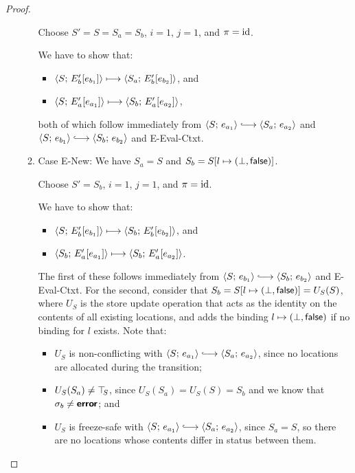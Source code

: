 \begin{proof}
\begin{enumerate}
\begin{enumerate}
      Choose $S' = S = S_a = S_b$, $i = 1$, $j = 1$, and $\pi = \mathrm{id}$.

      We have to show that:
      \begin{itemize}
      \item $\langle S;\, E'_b\hspace{-0.5mm}\left[e_{b_1}\right] \rangle \longmapsto
        \langle S_a;\, E'_b\hspace{-0.5mm}\left[e_{b_2}\right] \rangle$, and
      \item $\langle S;\, E'_a\hspace{-0.5mm}\left[e_{a_1}\right] \rangle \longmapsto
        \langle S_b;\, E'_a\hspace{-0.5mm}\left[e_{a_2}\right] \rangle$, 
      \end{itemize}

      both of which follow immediately from $\config{S}{e_{a_1}}
      \parstepsto \config{S_a}{e_{a_2}}$ and $\config{S}{e_{b_1}}
      \parstepsto \config{S_b}{e_{b_2}}$ and {\sc E-Eval-Ctxt}.

    \item \label{slqc-beta-new}Case {\sc E-New}: We have $S_a = S$ and
      $S_b = S[l \mapsto (\bot, \textsf{false})]$.

      Choose $S' = S_b$, $i = 1$, $j = 1$, and $\pi = \mathrm{id}$.

      We have to show that:
      \begin{itemize}
      \item $\langle S;\, E'_b\hspace{-0.5mm}\left[e_{b_1}\right] \rangle \longmapsto
        \langle S_b;\, E'_b\hspace{-0.5mm}\left[e_{b_2}\right] \rangle$, and
      \item $\langle S_b;\, E'_a\hspace{-0.5mm}\left[e_{a_1}\right] \rangle \longmapsto
        \langle S_b;\, E'_a\hspace{-0.5mm}\left[e_{a_2}\right] \rangle$.
      \end{itemize}

      The first of these follows immediately from $\config{S}{e_{b_1}}
      \parstepsto \config{S_b}{e_{b_2}}$ and {\sc E-Eval-Ctxt}.  For
      the second, consider that $S_b = S[l \mapsto (\bot, \textsf{false})]
      = U_S(S)$, where $U_S$ is the store update operation that acts
      as the identity on the contents of all existing locations, and
      adds the binding $l \mapsto (\bot, \textsf{false})$ if no
      binding for $l$ exists.  Note that:
      \begin{itemize}
      \item $U_S$ is non-conflicting with $\config{S}{e_{a_1}}
        \parstepsto \config{S_a}{e_{a_2}}$, since no locations are
        allocated during the transition;
        \item $U_S(S_a) \neq \top\hspace{-0.85mm}_{S}$, since $U_S(S_a) = U_S(S) = S_b$
          and we know that $\sigma_b \neq \textbf{\textsf{error}}$; and
        \item $U_S$ is freeze-safe with $\config{S}{e_{a_1}}
          \parstepsto \config{S_a}{e_{a_2}}$, since $S_a = S$, so
          there are no locations whose contents differ in status
          between them.
      \end{itemize}


\end{enumerate}
\end{enumerate}
\end{proof}

